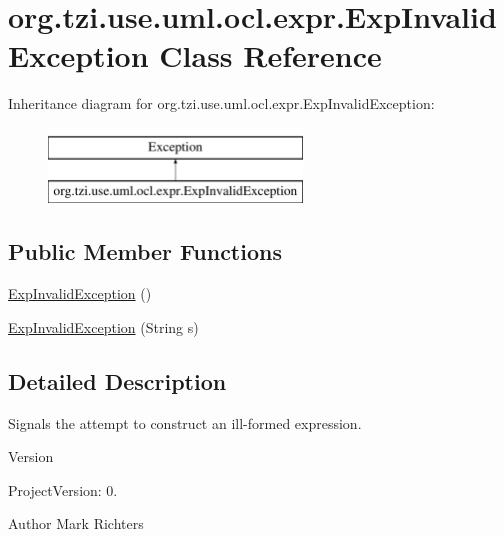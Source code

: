 \hypertarget{classorg_1_1tzi_1_1use_1_1uml_1_1ocl_1_1expr_1_1_exp_invalid_exception}{\section{org.\-tzi.\-use.\-uml.\-ocl.\-expr.\-Exp\-Invalid\-Exception Class Reference}
\label{classorg_1_1tzi_1_1use_1_1uml_1_1ocl_1_1expr_1_1_exp_invalid_exception}
}
Inheritance diagram for org.\-tzi.\-use.\-uml.\-ocl.\-expr.\-Exp\-Invalid\-Exception\-:\begin{figure}[H]
\begin{center}
\leavevmode
\includegraphics[height=2.000000cm]{classorg_1_1tzi_1_1use_1_1uml_1_1ocl_1_1expr_1_1_exp_invalid_exception}
\end{center}
\end{figure}
\subsection*{Public Member Functions}
\begin{DoxyCompactItemize}
\item 
\hyperlink{classorg_1_1tzi_1_1use_1_1uml_1_1ocl_1_1expr_1_1_exp_invalid_exception_ad8da60d91e0971c2600193884ef3f166}{Exp\-Invalid\-Exception} ()
\item 
\hyperlink{classorg_1_1tzi_1_1use_1_1uml_1_1ocl_1_1expr_1_1_exp_invalid_exception_af7bd5d1970cc0950fa49920045cc2bc2}{Exp\-Invalid\-Exception} (String s)
\end{DoxyCompactItemize}


\subsection{Detailed Description}
Signals the attempt to construct an ill-\/formed expression.

\begin{DoxyVersion}{Version}

\end{DoxyVersion}
\begin{DoxyParagraph}{Project\-Version\-:}
0. 
\end{DoxyParagraph}
\begin{DoxyAuthor}{Author}
Mark Richters 
\end{DoxyAuthor}



